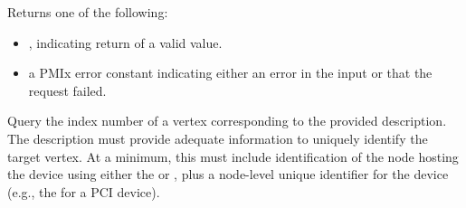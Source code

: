 Returns one of the following:

\begin{itemize}
    \item {}, indicating return of a valid value.
    \item a \ac{PMIx} error constant indicating either an error in the input or that the request failed.
\end{itemize}


\descr

Query the index number of a vertex corresponding to the provided description. The description must provide adequate information to uniquely identify the target vertex. At a minimum, this must include identification of the node hosting the device using either the  or , plus a node-level unique identifier for the device (e.g., the  for a \ac{PCI} device).


